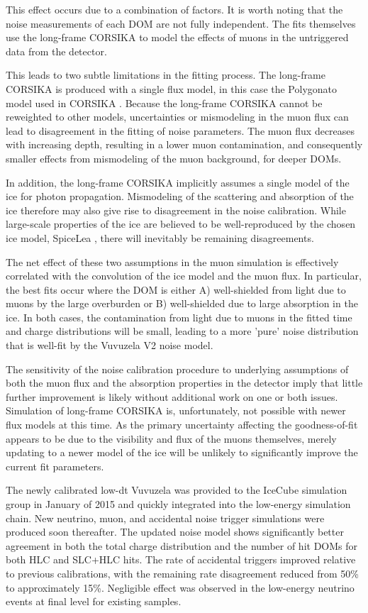 This effect occurs due to a combination of factors. 
It is worth noting that the noise measurements of each DOM are not fully independent.
The fits themselves use the long-frame CORSIKA to model the effects of muons in the untriggered data from the detector.

This leads to two subtle limitations in the fitting process.
The long-frame CORSIKA is produced with a single flux model, in this case the Polygonato model used in CORSIKA \cite{Hoerandel-Polygonato}.
Because the long-frame CORSIKA cannot be reweighted to other models, uncertainties or mismodeling in the muon flux can lead to disagreement in the fitting of noise parameters.
The muon flux decreases with increasing depth, resulting in a lower muon contamination, and consequently smaller effects from mismodeling of the muon background, for deeper DOMs. 

In addition, the long-frame CORSIKA implicitly assumes a single model of the ice for photon propagation.
Mismodeling of the scattering and absorption of the ice therefore may also give rise to disagreement in the noise calibration.
While large-scale properties of the ice are believed to be well-reproduced by the chosen ice model, SpiceLea \cite{IceCube-SpiceLea}, there will inevitably be remaining disagreements.

The net effect of these two assumptions in the muon simulation is effectively correlated with the convolution of the ice model and the muon flux.
In particular, the best fits occur where the DOM is either A) well-shielded from light due to muons by the large overburden or B) well-shielded due to large absorption in the ice.
In both cases, the contamination from light due to muons in the fitted time and charge distributions will be small, leading to a more 'pure' noise distribution that is well-fit by the Vuvuzela V2 noise model.

The sensitivity of the noise calibration procedure to underlying assumptions of both the muon flux and the absorption properties in the detector imply that little further improvement is likely without additional work on one or both issues.
Simulation of long-frame CORSIKA is, unfortunately, not possible with newer flux models at this time.
As the primary uncertainty affecting the goodness-of-fit appears to be due to the visibility and flux of the muons themselves, merely updating to a newer model of the ice will be unlikely to significantly improve the current fit parameters.

The newly calibrated low-dt Vuvuzela was provided to the IceCube simulation group in January of 2015 and quickly integrated into the low-energy simulation chain.
New neutrino, muon, and accidental noise trigger simulations were produced soon thereafter.
The updated noise model shows significantly better agreement in both the total charge distribution and the number of hit DOMs for both HLC and SLC+HLC hits.
The rate of accidental triggers improved relative to previous calibrations, with the remaining rate disagreement reduced from 50\% to approximately 15\%.
Negligible effect was observed in the low-energy neutrino events at final level for existing samples.

